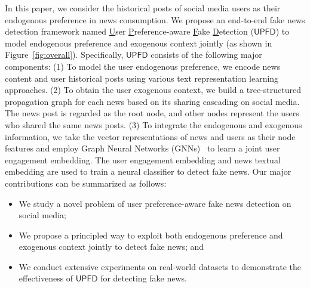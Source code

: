 \documentclass[sigconf]{acmart}
\newcommand\UPFD{$\mathsf{UPFD}$\xspace}
\begin{document}
In this paper, we consider the historical posts of social media users as their endogenous preference in news consumption.
We propose an end-to-end fake news detection framework named \underline{U}ser \underline{P}reference-aware \underline{F}ake \underline{D}etection (\UPFD) to model endogenous preference and exogenous context jointly (as shown in Figure~\ref{fig:overall}).
Specifically, \UPFD consists of the following major components: 
(1) To model the user endogenous preference, we encode news content and user historical posts using various text representation learning approaches.
(2) To obtain the user exogenous context, we build a tree-structured propagation graph for each news based on its sharing cascading on social media.
The news post is regarded as the root node, and other nodes represent the users who shared the same news posts.
(3) To integrate the endogenous and exogenous information, we take the vector representations of news and users as their node features and employ Graph Neural Networks (GNNs)~\cite{hamilton2017inductive, monti2019fake} to learn a joint user engagement embedding.
The user engagement embedding and news textual embedding are used to train a neural classifier to detect fake news.
Our major contributions can be summarized as follows:
\begin{itemize}[leftmargin=*]
    \item We study a novel problem of user preference-aware fake news detection on social media;
    \item We propose a principled way to exploit both endogenous preference and exogenous context jointly to detect fake news; and
    \item We conduct extensive experiments on real-world datasets to demonstrate the effectiveness of \UPFD for detecting fake news.
\end{itemize}
\end{document}
